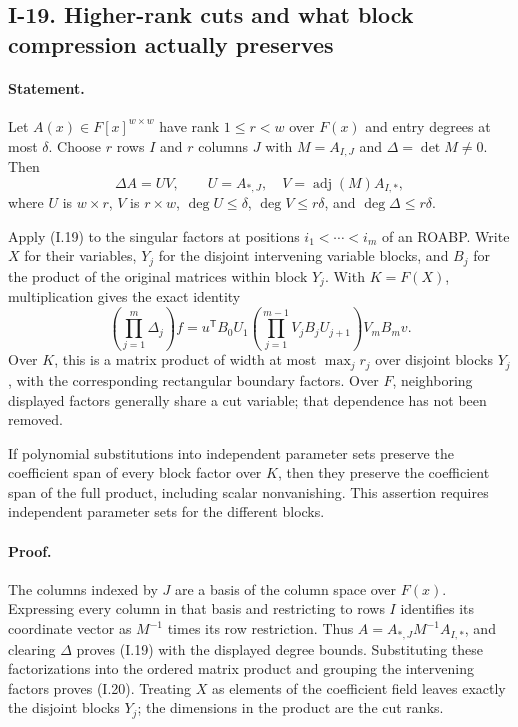 \documentclass[11pt,a4paper]{article}
\theoremstyle{definition}\newtheorem{definition}{Definition}
\begin{document}
\subsection{I-19. Higher-rank cuts and what block compression actually preserves}
\label{I-19}

\paragraph{Statement.}
Let $A(x)\in F[x]^{w\times w}$ have rank $1\le r<w$ over $F(x)$
and entry degrees at most $\delta$.  Choose $r$ rows $I$ and
$r$ columns $J$ with $M=A_{I,J}$ and $\Delta=\det M\ne0$.
Then
\[
 \Delta A=UV,\qquad
 U=A_{*,J},\quad V=\operatorname{adj}(M)A_{I,*},
\tag{I.19}\label{eq:I-rank-cut}
\]
where $U$ is $w\times r$, $V$ is $r\times w$,
$\deg U\le\delta$, $\deg V\le r\delta$, and
$\deg\Delta\le r\delta$.

Apply (I.19) to the singular factors at positions
$i_1<\cdots<i_m$ of an ROABP.  Write $X$ for their variables,
$Y_j$ for the disjoint intervening variable blocks, and $B_j$
for the product of the original matrices within block $Y_j$.
With $K=F(X)$, multiplication gives the exact identity
\[
 \left(\prod_{j=1}^m\Delta_j\right)f
 =u^{\mathsf T}B_0U_1
    \left(\prod_{j=1}^{m-1}V_jB_jU_{j+1}\right)V_mB_mv.
\tag{I.20}\label{eq:I-outer-cut}
\]
Over $K$, this is a matrix product of width at most
$\max_j r_j$ over disjoint blocks $Y_j$, with the corresponding
rectangular boundary factors.  Over $F$, neighboring displayed
factors generally share a cut variable; that dependence has not
been removed.

If polynomial substitutions into independent parameter sets preserve
the coefficient span of every block factor over $K$, then they
preserve the coefficient span of the full product, including scalar
nonvanishing.  This assertion requires independent parameter sets
for the different blocks.

\paragraph{Proof.}
The columns indexed by $J$ are a basis of the column space over
$F(x)$.  Expressing every column in that basis and restricting to
rows $I$ identifies its coordinate vector as $M^{-1}$ times its
row restriction.  Thus $A=A_{*,J}M^{-1}A_{I,*}$, and clearing
$\Delta$ proves (I.19) with the displayed degree bounds.
Substituting these factorizations into the ordered matrix product
and grouping the intervening factors proves (I.20).  Treating $X$
as elements of the coefficient field leaves exactly the disjoint
blocks $Y_j$; the dimensions in the product are the cut ranks.
\end{document}
